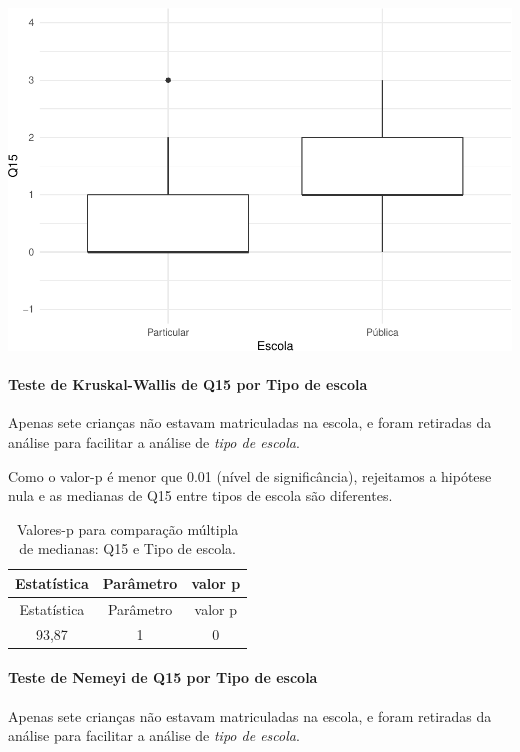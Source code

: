 \documentclass[]{article}
\let\oldparagraph\paragraph
\renewcommand{\paragraph}[1]{\oldparagraph{#1}\mbox{}}
\begin{document}
\begin{center}\includegraphics[width=0.75\linewidth]{relatorio_covid19_files/figure-latex/unnamed-chunk-117-1} \end{center}

\hypertarget{teste-de-kruskal-wallis-de-q15-por-tipo-de-escola}{%
\paragraph{Teste de Kruskal-Wallis de Q15 por Tipo de escola}\label{teste-de-kruskal-wallis-de-q15-por-tipo-de-escola}}

Apenas sete crianças não estavam matriculadas na escola, e foram retiradas da análise para facilitar a análise de \emph{tipo de escola}.

Como o valor-p é menor que 0.01 (nível de significância), rejeitamos a hipótese nula e as medianas de Q15 entre tipos de escola são diferentes.

\begin{longtable}[]{@{}ccc@{}}
\caption{\label{tab:unnamed-chunk-119}Valores-p para comparação múltipla de medianas: Q15 e Tipo de escola.}\tabularnewline
\toprule
Estatística & Parâmetro & valor p\tabularnewline
\midrule
\endfirsthead
\toprule
Estatística & Parâmetro & valor p\tabularnewline
\midrule
\endhead
93,87 & 1 & 0\tabularnewline
\bottomrule
\end{longtable}

\hypertarget{teste-de-nemeyi-de-q15-por-tipo-de-escola}{%
\paragraph{Teste de Nemeyi de Q15 por Tipo de escola}\label{teste-de-nemeyi-de-q15-por-tipo-de-escola}}

Apenas sete crianças não estavam matriculadas na escola, e foram retiradas da análise para facilitar a análise de \emph{tipo de escola}.
\end{document}
